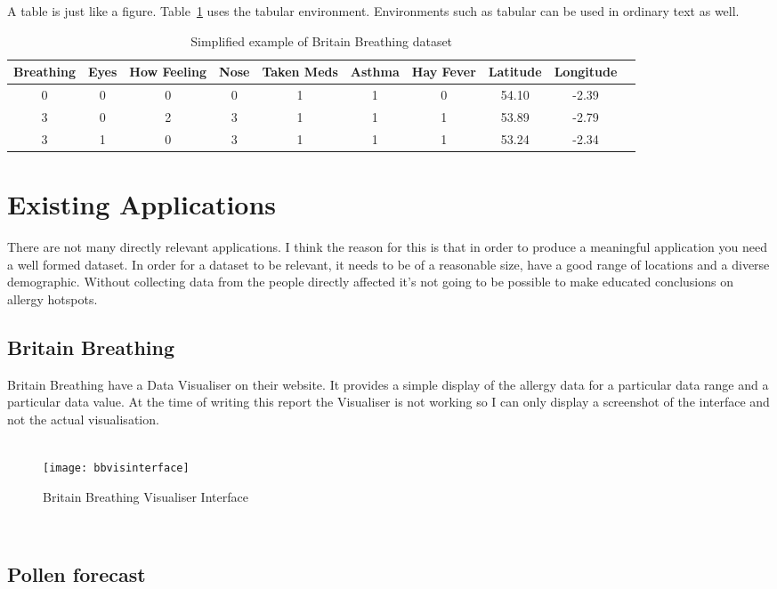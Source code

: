 A table is just like a figure. Table~\ref{wombat} uses the tabular
environment.  Environments such as tabular can be used in ordinary
text as well.
\begin{table}
\begin{center}
\begin{tabular}{|c|c|c|c|c|c|c|c|c|c}\hline\hline
Breathing&Eyes&How Feeling&Nose&Taken Meds&Asthma&Hay Fever&Latitude&Longitude\\\hline
0&0&0&0&1&1&0&54.10&-2.39\\
3&0&2&3&1&1&1&53.89&-2.79\\
3&1&0&3&1&1&1&53.24&-2.34\\\hline\hline
\end{tabular}
\end{center}
\caption{Simplified example of Britain Breathing dataset}\label{wombat}
\end{table}


\section{Existing Applications}
\label{sec:diagrams}

There are not many directly relevant applications. I think the reason for this is that in order to produce a meaningful application you need a well formed dataset. In order for a dataset to be relevant, it needs to be of a reasonable size, have a good range of locations and a diverse demographic. Without collecting data from the people directly affected it's not going to be possible to make educated conclusions on allergy hotspots.

\subsection{Britain Breathing}
Britain Breathing have a Data Visualiser on their website. It provides a simple display of the allergy data for a particular data range and a particular data value. At the time of writing this report the Visualiser is not working so I can only display a screenshot of the interface and not the actual visualisation.

\begin{figure}
\caption{Britain Breathing Visualiser Interface}\\
\centering
\texttt{[image: bbvisinterface]}
\centering
\end{figure}\\

\subsection{Pollen forecast}


